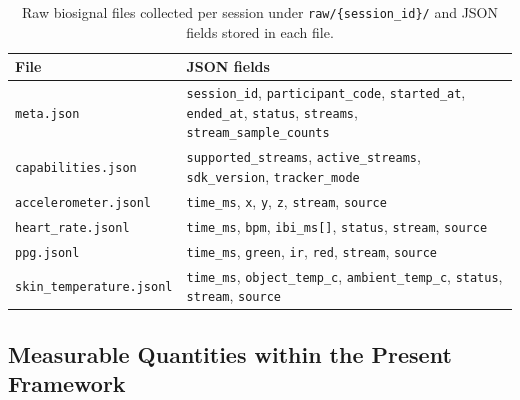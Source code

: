 \documentclass[sensors,article,submit,pdftex,moreauthors]{Definitions/mdpi}
\begin{document}
\begin{table}[H]

\caption{Raw biosignal files collected per session under \texttt{raw/\{session\_id\}/} and JSON fields stored in each file.\label{tab:rawstreams}}

\small

\begin{tabularx}{\textwidth}{@{}lX@{}}

\toprule

\textbf{File} & \textbf{JSON fields} \\

\midrule

\texttt{meta.json} & \texttt{session\_id}, \texttt{participant\_code}, \texttt{started\_at}, \texttt{ended\_at}, \texttt{status}, \texttt{streams}, \texttt{stream\_sample\_counts} \\

\texttt{capabilities.json} & \texttt{supported\_streams}, \texttt{active\_streams}, \texttt{sdk\_version}, \texttt{tracker\_mode} \\

\texttt{accelerometer.jsonl} & \texttt{time\_ms}, \texttt{x}, \texttt{y}, \texttt{z}, \texttt{stream}, \texttt{source} \\

\texttt{heart\_rate.jsonl} & \texttt{time\_ms}, \texttt{bpm}, \texttt{ibi\_ms[]}, \texttt{status}, \texttt{stream}, \texttt{source} \\

\texttt{ppg.jsonl} & \texttt{time\_ms}, \texttt{green}, \texttt{ir}, \texttt{red}, \texttt{stream}, \texttt{source} \\

\texttt{skin\_temperature.jsonl} & \texttt{time\_ms}, \texttt{object\_temp\_c}, \texttt{ambient\_temp\_c}, \texttt{status}, \texttt{stream}, \texttt{source} \\

\bottomrule

\end{tabularx}


\end{table}



\subsection{Measurable Quantities within the Present Framework}
\end{document}
